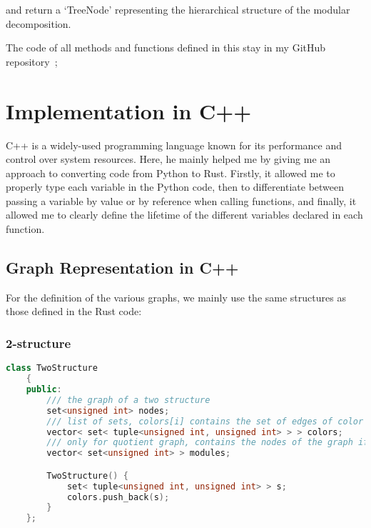and return a `TreeNode' representing the hierarchical structure of the modular decomposition.

\hspace{4cm}


The code of all methods and functions defined in this stay in my GitHub repository~\cite{rustcode};


\section{Implementation in C++}\label{sec:implementation-in-c++}

C++ is a widely-used programming language known for its performance and control over system resources.
Here, he mainly helped me by giving me an approach to converting code from Python to Rust.
Firstly, it allowed me to properly type each variable in the Python code, then to differentiate between passing a variable by value or by reference when calling functions, and finally, it allowed me to clearly define the lifetime of the different variables declared in each function.

\subsection{Graph Representation in C++}\label{subsec:graph-representation-in-c++}

For the definition of the various graphs, we mainly use the same structures as those defined in the Rust code:

\subsubsection{2-structure}

\begin{lstlisting}[language=C++, style=cpp, caption={Defining the 2-Structure with C++}, label={lst:cpp-define-2-structure}, firstnumber=1]
    class TwoStructure
    {
    public:
        /// the graph of a two structure
        set<unsigned int> nodes;
        /// list of sets, colors[i] contains the set of edges of color i
        vector< set< tuple<unsigned int, unsigned int> > > colors;
        /// only for quotient graph, contains the nodes of the graph if they are modules they
        vector< set<unsigned int> > modules;

        TwoStructure() {
            set< tuple<unsigned int, unsigned int> > s;
            colors.push_back(s);
        }
    };
\end{lstlisting}

